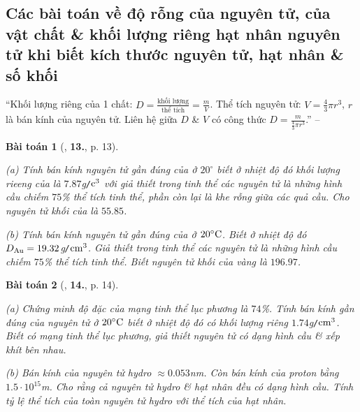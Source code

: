 \documentclass{article}
\numberwithin{equation}{section}
\newtheorem{baitoan}{Bài toán}[section]
\begin{document}

\subsection{Các bài toán về độ rỗng của nguyên tử, của vật chất \& khối lượng riêng hạt nhân nguyên tử khi biết kích thước nguyên tử, hạt nhân \& số khối}
``Khối lượng riêng của 1 chất: $D = \frac{\mbox{khối lượng}}{\mbox{thể tích}} = \frac{m}{V}$. Thể tích nguyên tử: $V = \frac{4}{3}\pi r^3$, $r$ là bán kính của nguyên tử. Liên hệ giữa $D$ \& $V$ có công thức $D = \frac{m}{\frac{4}{3}\pi r^3}$.'' -- \cite[p. 13]{An2012}

\begin{baitoan}[\cite{An2012}, \textbf{13.}, p. 13]
	\begin{enumerate*}
		\item[(a)] Tính bán kính nguyên tử gần đúng của \emph{} ở $20^\circ$ biết ở nhiệt độ đó khối lượng rieeng của \emph{} là $7.87$\emph{g\texttt{/}$\rm c^3$} với giả thiết trong tinh thể các nguyên tử \emph{} là những hình cầu chiếm $75$\% thể tích tinh thể, phần còn lại là khe rỗng giữa các quả cầu. Cho nguyên tử khối của \emph{} là $55.85$.
		\item[(b)] Tính bán kính nguyên tử gần đúng của \emph{} ở $\rm 20^\circ C$. Biết ở nhiệt độ đó $D_{\ce{Au}} = 19.32$\emph{g\texttt{/}$\rm cm^3$}. Giả thiết trong tinh thể các nguyên tử \emph{} là những hình cầu chiếm $75$\% thể tích tinh thể. Biết nguyên tử khối của vàng là $196.97$.
	\end{enumerate*}
\end{baitoan}

\begin{baitoan}[\cite{An2012}, \textbf{14.}, p. 14]
	\begin{enumerate*}
		\item[(a)] Chứng minh độ đặc của mạng tinh thể lục phương là $74$\%. Tính bán kính gần đúng của nguyên tử \emph{} ở $\rm 20^\circ C$ biết ở nhiệt độ đó \emph{} có khối lượng riêng $1.74$\emph{g\texttt{/}$\rm cm^3$}. Biết \emph{} có mạng tinh thể lục phương, giả thiết nguyên tử có dạng hình cầu \& xếp khít bên nhau.
		\item[(b)] Bán kính của nguyên tử hydro $\approx0.053$\emph{nm}. Còn bán kính của proton bằng $1.5\cdot 10^{15}$\emph{m}. Cho rằng cả nguyên tử hydro \& hạt nhân đều có dạng hình cầu. Tính tỷ lệ thể tích của toàn nguyên tử hydro với thể tích của hạt nhân.
	\end{enumerate*}
\end{baitoan}
\end{document}
